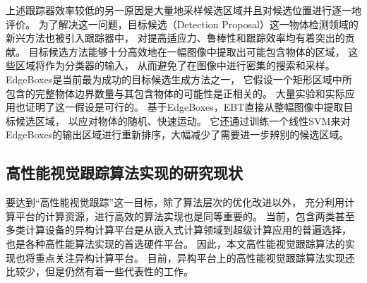 上述跟踪器效率较低的另一原因是大量地采样候选区域并且对候选位置进行逐一地评价。
为了解决这一问题，目标候选（Detection Proposal）这一物体检测领域的新兴方法也被引入跟踪器中，
对提高适应力、鲁棒性和跟踪效率均有着突出的贡献。
目标候选方法能够十分高效地在一幅图像中提取出可能包含物体的区域，
这些区域将作为分类器的输入，
从而避免了在图像中进行密集的搜索和采样。
EdgeBoxes是当前最为成功的目标候选生成方法之一，
它假设一个矩形区域中所包含的完整物体边界数量与其包含物体的可能性是正相关的。
大量实验和实际应用也证明了这一假设是可行的。
基于EdgeBoxes，EBT直接从整幅图像中提取目标候选区域，
以应对物体的随机、快速运动。
它还通过训练一个线性SVM来对EdgeBoxes的输出区域进行重新排序，大幅减少了需要进一步辨别的候选区域。

\subsection{高性能视觉跟踪算法实现的研究现状}
要达到``高性能视觉跟踪''这一目标，除了算法层次的优化改进以外，
充分利用计算平台的计算资源，进行高效的算法实现也是同等重要的。
当前，包含两类甚至多类计算设备的异构计算平台是从嵌入式计算领域到超级计算应用的普遍选择，
也是各种高性能算法实现的首选硬件平台。
因此，本文高性能视觉跟踪算法的实现也将重点关注异构计算平台。
目前，异构平台上的高性能视觉跟踪算法实现还比较少，但是仍然有着一些代表性的工作。

